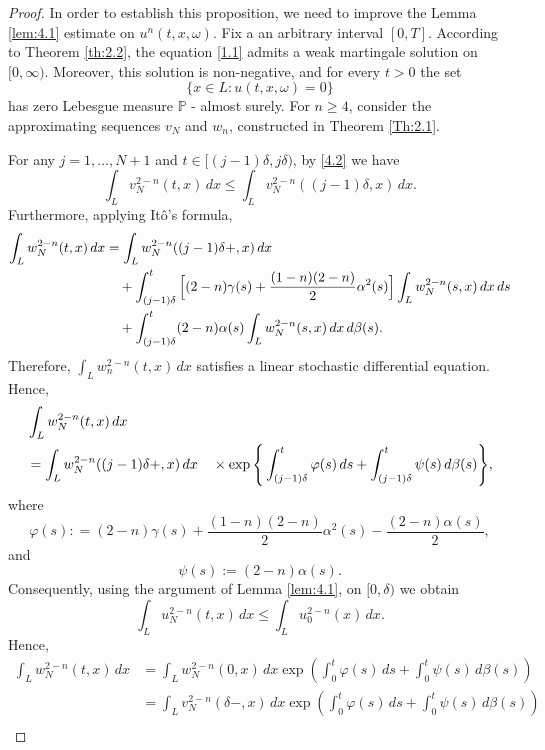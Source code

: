 \documentclass[10pt,a4paper]{amsart}
\def\f{\varphi}
\begin{document}
\begin{proof}
In order to establish this proposition, we need to improve the Lemma \ref{lem:4.1} estimate on $u^{n}(t,x,\omega)$. Fix a an arbitrary interval $[0,T]$. According to Theorem \ref{th:2.2}, the equation \eqref{1.1} admits a weak martingale solution on $[0,\infty)$. Moreover, this solution is non-negative, and for every $t>0$ the set
\[
\{ x \in L : u(t,x,\omega)=0 \}
\]
has zero Lebesgue measure $\mathbb{P}$ - almost surely.
For $n \ge 4$, consider the approximating sequences
$v_N$ and $w_n$, constructed in Theorem \ref{Th:2.1}.

For any $j=1,\dots,N+1$ and
$t \in [(j-1)\delta,j\delta)$, by \eqref{4.2} we have 
\begin{equation*}
\int_{L} v_N^{2-n}(t,x)\,dx
\le
\int_{L} v_N^{2-n}((j-1)\delta,x)\,dx.
\label{5.1}
\end{equation*}
Furthermore, applying It\^o's formula,
\begin{align*}
\int_{L} w_N^{2-n}(t,x)\,dx
&=
\int_{L} w_N^{2-n}((j-1)\delta+,x)\,dx \notag \\
&\quad
+ \int_{(j-1)\delta}^{t}
\Big[(2-n)\gamma(s)
+ \frac{(1-n)(2-n)}{2}\alpha^2(s)\Big]
\int_{L} w_N^{2-n}(s,x)\,dx\,ds \notag \\
&\quad
+ \int_{(j-1)\delta}^{t}
(2-n)\alpha(s)
\int_{L} w_N^{2-n}(s,x)\,dx\, d\beta(s).
\label{5.2}
\end{align*}
Therefore, $\displaystyle \int_{L} w_n^{2-n}(t,x)\,dx$
satisfies a linear stochastic differential equation.
Hence,
\begin{align*}
&\int_{L} w_N^{2-n}(t,x)\,dx \\
& =
\int_{L} w_N^{2-n}((j-1)\delta+,x)\,dx  \notag 
\quad \times
\exp\Bigg\{
\int_{(j-1)\delta}^{t}
\varphi(s)\,ds
+
\int_{(j-1)\delta}^{t}
\psi(s)\,d\beta(s)
\Bigg\},
\end{align*}
where
\[
\f(s): = (2-n)\gamma(s)
+ \frac{(1-n)(2-n)}{2}\alpha^2(s) - \frac{(2-n)\alpha(s)}{2},
\]
and 
\[
\psi(s):= (2-n) \alpha(s).
\]
Consequently, using the argument of Lemma \ref{lem:4.1}, on $[0, \delta)$ we obtain
\begin{equation*}
\int_{L} u_N^{2-n}(t,x)\,dx
\le
\int_{L} u_0^{2-n}(x)\,dx.
\end{equation*}
Hence,
\begin{align*}
    \int_{L} w_N^{2-n}(t,x)\,dx
& = \int_{L} w_N^{2-n}(0,x)\,dx
\exp\left( \int_0^t \varphi(s)\,ds + \int_0^t \psi(s)\,d\beta(s) \right) \\
& = \int_{L} v_N^{2-n}(\delta-,x)\,dx
\exp\left( \int_0^t \varphi(s)\,ds + \int_0^t \psi(s)\,d\beta(s) \right) \\

\end{align*}
\end{proof}
\end{document}
